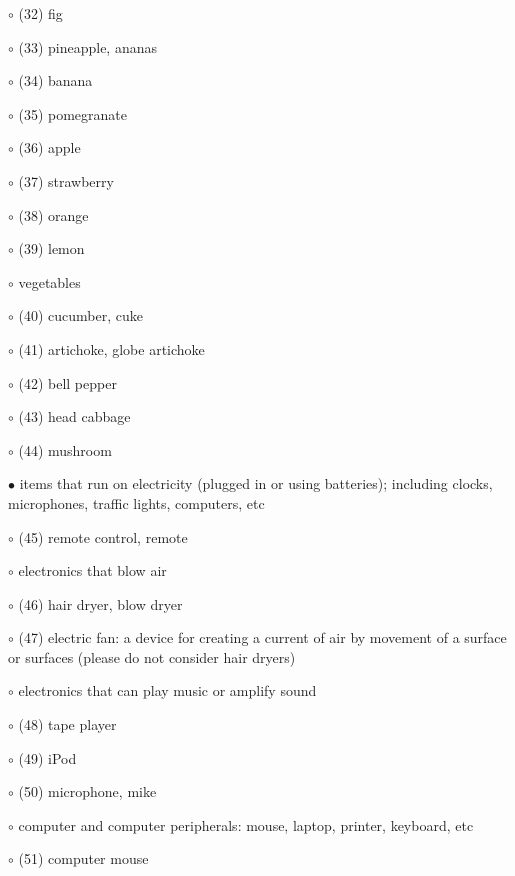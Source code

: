 \noindent \leftskip=0.5cm $\circ$ (32) fig

\noindent \leftskip=0.5cm $\circ$ (33) pineapple, ananas

\noindent \leftskip=0.5cm $\circ$ (34) banana

\noindent \leftskip=0.5cm $\circ$ (35) pomegranate

\noindent \leftskip=0.5cm $\circ$ (36) apple

\noindent \leftskip=0.5cm $\circ$ (37) strawberry

\noindent \leftskip=0.5cm $\circ$ (38) orange

\noindent \leftskip=0.5cm $\circ$ (39) lemon

\noindent \leftskip=0.25cm $\circ$ vegetables

\noindent \leftskip=0.5cm $\circ$ (40) cucumber, cuke

\noindent \leftskip=0.5cm $\circ$ (41) artichoke, globe artichoke

\noindent \leftskip=0.5cm $\circ$ (42) bell pepper

\noindent \leftskip=0.5cm $\circ$ (43) head cabbage

\noindent \leftskip=0.25cm $\circ$ (44) mushroom

\noindent \leftskip=0.0cm $\bullet$ items that run on electricity (plugged in or using batteries); including clocks, microphones, traffic lights, computers, etc

\noindent \leftskip=0.25cm $\circ$ (45) remote control, remote

\noindent \leftskip=0.25cm $\circ$ electronics that blow air

\noindent \leftskip=0.5cm $\circ$ (46) hair dryer, blow dryer

\noindent \leftskip=0.5cm $\circ$ (47) electric fan: a device for creating a current of air by movement of a surface or surfaces (please do not consider hair dryers)

\noindent \leftskip=0.25cm $\circ$ electronics that can play music or amplify sound

\noindent \leftskip=0.5cm $\circ$ (48) tape player

\noindent \leftskip=0.5cm $\circ$ (49) iPod

\noindent \leftskip=0.25cm $\circ$ (50) microphone, mike

\noindent \leftskip=0.25cm $\circ$ computer and computer peripherals: mouse, laptop, printer, keyboard, etc

\noindent \leftskip=0.5cm $\circ$ (51) computer mouse

